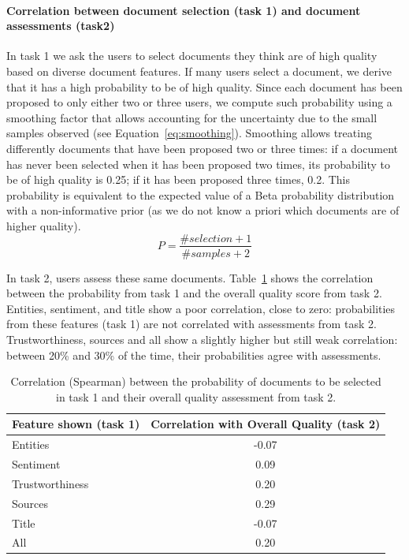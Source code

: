 \documentclass{llncs}
\begin{document}
\paragraph{Correlation between document selection (task 1) and document assessments (task2)}
In task 1 we ask the users to select documents they think are of high quality based on diverse document features. If many users select a document, we derive that it has a high probability to be of high quality. Since each document has been proposed to only either two or three users, we compute such probability using a smoothing factor that allows accounting for the uncertainty due to the small samples observed (see Equation~\eqref{eq:smoothing}). Smoothing allows treating differently documents that have been proposed two or three times: if a document has never been selected when it has been proposed two times, its probability to be of high quality is 0.25; if it has been proposed three times, 0.2. This probability is equivalent to the expected value of a Beta probability distribution with a non-informative prior (as we do not know a priori which documents are of higher quality).
\begin{equation}
P = \frac{\# selection +1}{\# samples + 2}
\label{eq:smoothing}
\end{equation}

In task 2, users assess these same documents. Table~\ref{tab:t1t2corrj} shows the correlation between the probability from task 1 and the overall quality score from task 2. Entities, sentiment, and title show a poor correlation, close to zero: probabilities from these features (task 1) are not correlated with assessments from task 2. Trustworthiness, sources and all show a slightly higher but still weak correlation: between 20\% and 30\% of the time, their probabilities agree with assessments.
%
%
%

\begin{table}
\centering
\caption{Correlation (Spearman) between the probability of documents to be selected in task 1 and their overall quality assessment from task 2.\label{tab:t1t2corrj}}
\begin{tabular}{|l|c|}
\hline
{\bf Feature shown (task 1)} & {\bf Correlation with Overall Quality (task 2)}  \\
\hline
Entities & -0.07 \\ \hline
Sentiment & 0.09 \\ \hline
Trustworthiness & 0.20 \\ \hline
Sources & 0.29 \\ \hline
Title & -0.07 \\ \hline
All & 0.20 \\ \hline
\end{tabular}
\end{table}
\end{document}
